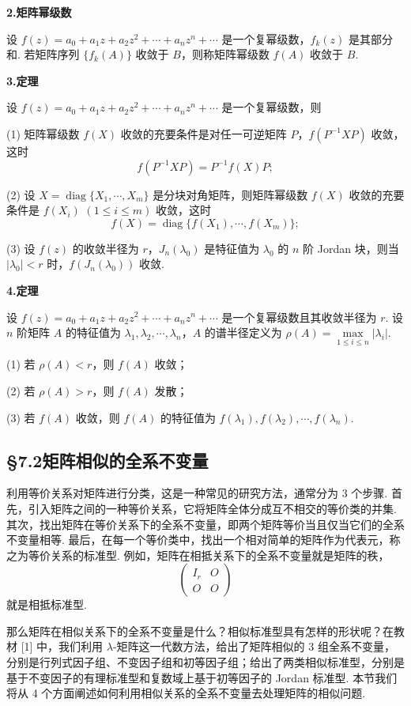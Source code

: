 \documentclass[UTF8, 12pt, fontset=fandol, oneside]{ctexart}
\begin{document}
\noindent\textbf{2.\quad 矩阵幂级数}

设 $f(z)=a_0+a_1z+a_2z^2+\cdots+a_nz^n+\cdots$ 是一个复幂级数，$f_k(z)$ 是其部分和. 若矩阵序列 $\{f_k(A)\}$ 收敛于 $B$，则称矩阵幂级数 $f(A)$ 收敛于 $B$.

\noindent\textbf{3.\quad 定理}

设 $f(z)=a_0+a_1z+a_2z^2+\cdots+a_nz^n+\cdots$ 是一个复幂级数，则

(1) 矩阵幂级数 $f(X)$ 收敛的充要条件是对任一可逆矩阵 $P$，$f(P^{-1}XP)$ 收敛，这时
\[
f(P^{-1}XP)=P^{-1}f(X)P;
\]

(2) 设 $X=\operatorname{diag}\{X_1,\cdots,X_m\}$ 是分块对角矩阵，则矩阵幂级数 $f(X)$ 收敛的充要条件是 $f(X_i)$ $(1\le i\le m)$ 收敛，这时
\[
f(X)=\operatorname{diag}\{f(X_1),\cdots,f(X_m)\};
\]

(3) 设 $f(z)$ 的收敛半径为 $r$，$J_n(\lambda_0)$ 是特征值为 $\lambda_0$ 的 $n$ 阶 Jordan 块，则当 $|\lambda_0|<r$ 时，$f(J_n(\lambda_0))$ 收敛.

\noindent\textbf{4.\quad 定理}

设 $f(z)=a_0+a_1z+a_2z^2+\cdots+a_nz^n+\cdots$ 是一个复幂级数且其收敛半径为 $r$.
设 $n$ 阶矩阵 $A$ 的特征值为 $\lambda_1,\lambda_2,\cdots,\lambda_n$，$A$ 的谱半径定义为 $\rho(A)=\max\limits_{1\le i\le n}|\lambda_i|$.

(1) 若 $\rho(A)<r$，则 $f(A)$ 收敛；

(2) 若 $\rho(A)>r$，则 $f(A)$ 发散；

(3) 若 $f(A)$ 收敛，则 $f(A)$ 的特征值为 $f(\lambda_1),f(\lambda_2),\cdots,f(\lambda_n)$.

\subsection*{§7.2\quad 矩阵相似的全系不变量}

利用等价关系对矩阵进行分类，这是一种常见的研究方法，通常分为 3 个步骤. 首先，引入矩阵之间的一种等价关系，它将矩阵全体分成互不相交的等价类的并集. 其次，找出矩阵在等价关系下的全系不变量，即两个矩阵等价当且仅当它们的全系不变量相等. 最后，在每一个等价类中，找出一个相对简单的矩阵作为代表元，称之为等价关系的标准型. 例如，矩阵在相抵关系下的全系不变量就是矩阵的秩，
\[
\left(\begin{array}{cc}
I_r & O\\
O & O
\end{array}\right)
\]
就是相抵标准型.

那么矩阵在相似关系下的全系不变量是什么？相似标准型具有怎样的形状呢？在教材 [1] 中，我们利用 $\lambda$-矩阵这一代数方法，给出了矩阵相似的 3 组全系不变量，分别是行列式因子组、不变因子组和初等因子组；给出了两类相似标准型，分别是基于不变因子的有理标准型和复数域上基于初等因子的 Jordan 标准型. 本节我们将从 4 个方面阐述如何利用相似关系的全系不变量去处理矩阵的相似问题.
\end{document}
